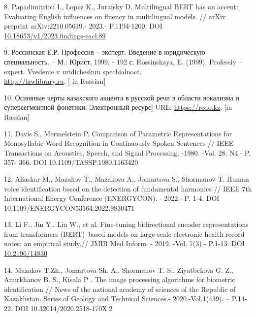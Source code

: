 \begin{references}
8. Papadimitriou I., Lopez K., Jurafsky D. Multilingual BERT has an
accent: Evaluating English influences on fluency in multilingual models.
// arXiv preprint arXiv:2210.05619.- 2023.- P.1194-1200. DOI
\\\href{https://doi.org/10.18653/v1/2023.findings-eacl.89}{10.18653/v1/2023.findings-eacl.89}

9. Россинская Е.Р. Профессия -- эксперт. Введение в юридическую
специальность. -- М.: Юрист, 1999. - 192 с. Rossinskaya, E. (1999).
Professiy -- expert. Vvedenie v uridicheskuu spechialnoct.
\\\href{http://lawlibrary.ru/izdanie20672.html}{http://lawlibrary.ru}. {[} in Russian{]}

10. Основные черты казахского акцента в русской речи в области вокализма
и суперсегментной фонетики. Электронный ресурс{]} URL:
\href{https://rcdo.kz/publ/9555-osnovnye-cherty-kazahskogo-akcenta-v-russkoy-rechi-v-oblasti-vokalizma-i-supersegmentnoy-fonetiki.html}{https://rcdo.kz}.
{[}in Russian{]}

11. Davis S., Mermelstein P. Comparison of Parametric Representations
for Monosyllabic Word Recognition in Continuously Spoken Sentences //
IEEE Transactions on Acoustics, Speech, and Signal Processing. -1980.
-Vol. 28, N4.- P. 357- 366. DOI 10.1109/TASSP.1980.1163420

12. Aliaskar M., Mazakov T., Mazakova A., Jomartova S., Shormanov T.
Human voice identification based on the detection of fundamental
harmonics // IEEE 7th International Energy Conference (ENERGYCON). -
2022.- P. 1-4. DOI 10.1109/ENERGYCON53164.2022.9830471

13. Li F., Jin Y., Liu W., et al. Fine-tuning bidirectional encoder
representations from transformers (BERT)--based models on large-scale
electronic health record notes: an empirical study.// JMIR Med Inform. -
2019. -Vol. 7(3) - P.1-13. DOI
\href{https://doi.org/10.2196/14830}{10.2196/14830}

14. Mazakov T.Zh., Jomartova Sh. A., Shormanov T. S., Ziyatbekova G. Z.,
Amirkhanov B. S., Kisala P . The image processing algorithms for
biometric identification // News of the national academy of sciences of
the Republic of Kazakhstan. Series of Geology and Technical Sciences.-
2020.-Vol.1(439). -- P.14-22. DOI 10.32014/2020.2518-170Х.2
\end{references}

